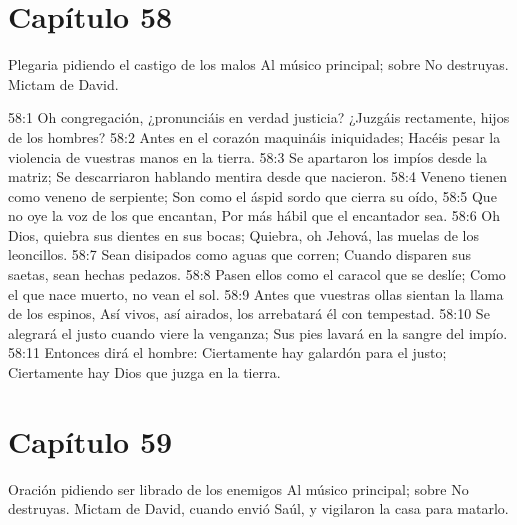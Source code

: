 \section*{Capítulo 58}
Plegaria pidiendo el castigo de los malos 
Al músico principal; sobre No destruyas. Mictam de David. 
 
58:1 Oh congregación, ¿pronunciáis en verdad justicia? 
¿Juzgáis rectamente, hijos de los hombres? 
58:2 Antes en el corazón maquináis iniquidades; 
Hacéis pesar la violencia de vuestras manos en la tierra. 
58:3 Se apartaron los impíos desde la matriz; 
Se descarriaron hablando mentira desde que nacieron. 
58:4 Veneno tienen como veneno de serpiente; 
Son como el áspid sordo que cierra su oído, 
58:5 Que no oye la voz de los que encantan, 
Por más hábil que el encantador sea. 
58:6 Oh Dios, quiebra sus dientes en sus bocas; 
Quiebra, oh Jehová, las muelas de los leoncillos. 
58:7 Sean disipados como aguas que corren; 
Cuando disparen sus saetas, sean hechas pedazos. 
58:8 Pasen ellos como el caracol que se deslíe; 
Como el que nace muerto, no vean el sol. 
58:9 Antes que vuestras ollas sientan la llama de los espinos, 
Así vivos, así airados, los arrebatará él con tempestad. 
58:10 Se alegrará el justo cuando viere la venganza; 
Sus pies lavará en la sangre del impío. 
58:11 Entonces dirá el hombre: Ciertamente hay galardón para el justo; 
Ciertamente hay Dios que juzga en la tierra. 
\section*{Capítulo 59}
Oración pidiendo ser librado de los enemigos 
Al músico principal; sobre No destruyas. Mictam de David, cuando envió Saúl, y vigilaron la casa para matarlo. 
 
